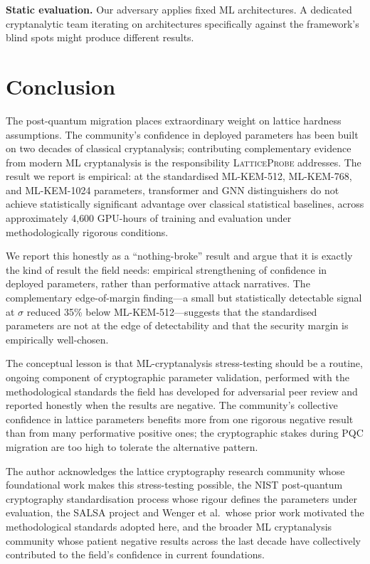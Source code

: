 \documentclass[sigconf,nonacm]{acmart}
\begin{document}
\textbf{Static evaluation.} Our adversary applies fixed ML
architectures. A dedicated cryptanalytic team iterating on
architectures specifically against the framework's blind spots
might produce different results.

\section{Conclusion}

The post-quantum migration places extraordinary weight on lattice
hardness assumptions. The community's confidence in deployed
parameters has been built on two decades of classical cryptanalysis;
contributing complementary evidence from modern ML cryptanalysis is
the responsibility \textsc{LatticeProbe} addresses. The result we
report is empirical: at the standardised ML-KEM-512, ML-KEM-768, and
ML-KEM-1024 parameters, transformer and GNN distinguishers do not
achieve statistically significant advantage over classical
statistical baselines, across approximately 4{,}600 GPU-hours of
training and evaluation under methodologically rigorous conditions.

We report this honestly as a ``nothing-broke'' result and argue that
it is exactly the kind of result the field needs: empirical
strengthening of confidence in deployed parameters, rather than
performative attack narratives. The complementary edge-of-margin
finding---a small but statistically detectable signal at $\sigma$
reduced 35\% below ML-KEM-512---suggests that the standardised
parameters are not at the edge of detectability and that the
security margin is empirically well-chosen.

The conceptual lesson is that ML-cryptanalysis stress-testing should
be a routine, ongoing component of cryptographic parameter validation,
performed with the methodological standards the field has developed
for adversarial peer review and reported honestly when the results
are negative. The community's collective confidence in lattice
parameters benefits more from one rigorous negative result than from
many performative positive ones; the cryptographic stakes during
PQC migration are too high to tolerate the alternative pattern.

\begin{acks}
The author acknowledges the lattice cryptography research community
whose foundational work makes this stress-testing possible, the NIST
post-quantum cryptography standardisation process whose rigour
defines the parameters under evaluation, the SALSA project and
Wenger et al.\ whose prior work motivated the methodological
standards adopted here, and the broader ML cryptanalysis community
whose patient negative results across the last decade have
collectively contributed to the field's confidence in current
foundations.
\end{acks}
\end{document}
